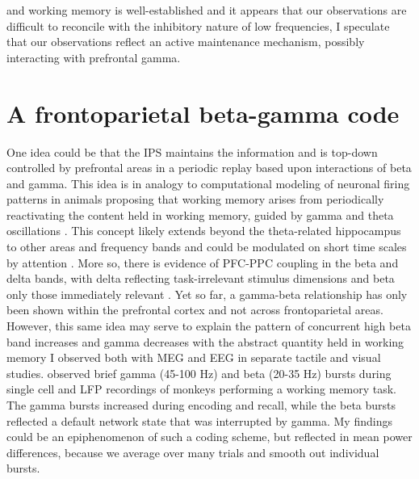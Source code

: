 and working memory is well-established and it appears that our observations are difficult to reconcile with the inhibitory nature of low frequencies, I speculate that our observations reflect an active maintenance mechanism, possibly interacting with prefrontal gamma.
\section{A frontoparietal beta-gamma code}
One idea could be that the IPS maintains the information and is top-down controlled by prefrontal areas in a periodic replay based upon interactions of beta and gamma. This idea is in analogy to computational modeling of neuronal firing patterns in animals proposing that working memory arises from periodically reactivating the content held in working memory, guided by gamma and theta oscillations \parencite{Fuentemilla2010,Jensen2005,Lisman1999,Lisman1995}. This concept likely extends beyond the theta-related hippocampus to other areas and frequency bands \parencite{Lundqvist2016,Mongillo2008} and could be modulated on short time scales by attention \parencite{Awh1998}. More so, there is evidence of PFC-PPC coupling in the beta and delta bands, with delta reflecting task-irrelevant stimulus dimensions and beta only those immediately relevant \parencite{Antzoulatos2016}. Yet so far, a gamma-beta relationship has only been shown within the prefrontal cortex \parencite{Lundqvist2016} and not across frontoparietal areas. 
However, this same idea may serve to explain the pattern of concurrent high beta band increases and gamma decreases with the abstract quantity held in working memory I observed both with MEG and EEG in separate tactile and visual studies. \textcite{Lundqvist2016} observed brief gamma (45-100 Hz) and beta (20-35 Hz) bursts during single cell and LFP recordings of monkeys performing a working memory task. The gamma bursts increased during encoding and recall, while the beta bursts reflected a default network state that was interrupted by gamma. My findings could be an epiphenomenon of such a coding scheme, but reflected in mean power differences, because we average over many trials and smooth out individual bursts. 
